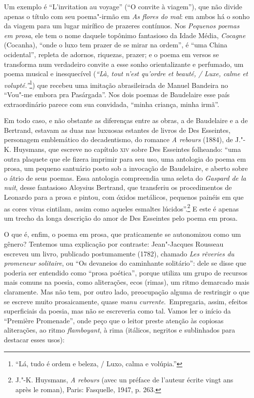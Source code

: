 Um exemplo é “L’invitation au voyage” (“O convite à viagem”), que não
divide apenas o título com seu poema"-irmão em \textit{As flores do
mal}: em ambos há o sonho da viagem para um lugar mirífico de prazeres
contínuos. Nos \textit{Pequenos poemas em prosa}, ele tem o nome daquele
topônimo fantasioso da Idade Média, \textit{Cocagne} (Cocanha), “onde
o luxo tem prazer de se mirar na ordem”, é “uma China ocidental”,
repleta de adornos, riquezas, prazer; e o poema em versos se transforma
num verdadeiro convite a esse sonho orientalizante e perfumado, um
poema musical e inesquecível (\textit{“Là, tout n’est qu’ordre et
beauté, / Luxe, calme et volupté.”}\footnote{ “Lá, tudo é ordem e beleza, / 
Luxo, calma e volúpia.”}) que recebeu uma imitação abrasileirada de
Manuel Bandeira no “Vou"-me embora pra Pasárgada”. Nos dois poemas de
Baudelaire esse país extraordinário parece com sua convidada, “minha
criança, minha irmã”.

Em todo caso, e não obstante as diferenças entre as obras, a de
Baudelaire e a de Bertrand, estavam as duas nas luxuosas estantes de
livros de Des Esseintes, personagem emblemático do decadentismo, do
romance \textit{A rebours} (1884), de J."-K. Huysmans, que escreve no
capítulo \textsc{xiv} sobre Des Esseintes folheando: “uma outra plaquete que ele
fizera imprimir para seu uso, uma antologia do poema em prosa, um
pequeno santuário posto sob a invocação de Baudelaire, e aberto sobre o
átrio de seus poemas. Essa antologia compreendia uma seleta do
\textit{Gaspard de la nuit}, desse fantasioso Aloysius Bertrand, que
transferiu os procedimentos de Leonardo para a prosa e pintou, com
óxidos metálicos, pequenos painéis em que as cores vivas cintilam,
assim como aqueles esmaltes lúcidos”.\footnote{ J."-K. Huysmans,  \textit{A
rebours} (avec un préface de l’auteur écrite vingt ans après le roman),
Paris: Fasquelle, 1947, p. 263.}  E este é apenas um trecho da
longa descrição do amor de Des Esseintes pelo poema em prosa.

O que é, enfim, o poema em prosa, que praticamente se autonomizou como
um gênero? Tentemos uma explicação por contraste: Jean"-Jacques
Rousseau escreveu um livro, publicado postumamente (1782), chamado
\textit{Les rêveries du promeneur solitaire}, ou “Os devaneios do
caminhante solitário”: dele se disse que poderia ser entendido como
“prosa poética”, porque utiliza um grupo de recursos mais comuns na
poesia, como aliterações, ecos (rimas), um ritmo demarcado mais
claramente. Mas não tem, por outro lado, preocupação alguma de
restringir o que se escreve muito prosaicamente, quase \textit{manu
currente}.~Empregaria, assim, efeitos superficiais da poesia, mas não
se escreveria como tal. Vamos ler o início da “Première Promenade”,
onde peço que o leitor preste atenção às copiosas aliterações, ao ritmo
\textit{flamboyant}, à rima (itálicos, negritos e sublinhados para
destacar esses usos):



